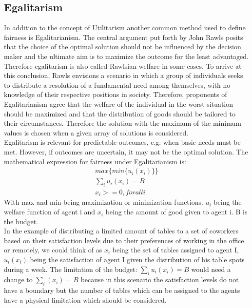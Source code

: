 \documentclass[german, a4paper, 11pt, oneside]{scrbook}
\begin{document}
\subsection{Egalitarism}
In addition to the concept of Utilitarism another common method used to define fairness is Egalitarianism. The central argument put forth by John Rawls posits that the choice of the optimal solution should not be influenced by the decision maker and the ultimate aim is to maximize the outcome for the least advantaged. \cite{XinyingChen.2023,.} Therefore egalitarism is also called Rawlsian welfare in some cases. To arrive at this conclusion, Rawls envisions a scenario in which a group of individuals seeks to distribute a resolution of a fundamental need among themselves, with no knowledge of their respective positions in society. Therefore, proponents of Egalitarianism agree that the welfare of the individual in the worst situation should be maximized and that the distribution of goods should be tailored to their circumstances. Therefore the solution with the maximum of the minimum values is chosen when a given array of solutions is considered. \\
 \cite{XinyingChen.2023,.,FelixBrandtVincentConitzerUlleEndrissJeromeLangandArielD.Procaccia.} Egalitarism is relevant for predictable outcomes, e.g. when basic needs must be met.\cite{.} However, if outcomes are uncertain, it may not be the optimal solution. The mathematical expression for fairness under Egalitarianism is: \cite{.}
\begin{align}
max\{ min\{u_i(x_i)\}\}\\
\sum_{i}u_i(x_i) = B\\
x_i>=0, for all  i
\end{align}
With max and min being maximization or minimization functions. $u_i$ being the welfare function of agent i and $x_i$ being the amount of good given to agent i. B is the budget.
\\In the example of distributing a limited amount of tables to a set of coworkers based on their satisfaction levels due to their preferences of working in the office or remotely, we could think of as $x_i$ being the set of tables assigned to agent I, $u_i(x_i)$ being the satisfaction of agent I given the distribution of his table spots during a week. The limitation of the budget: $\sum_{i}u_i(x_i) = B$ would need a change to $\sum_{i}(x_i) = B$ because in this scenario the satisfaction levels do not have a boundary but the number of tables which can be assigned to the agents have a physical limitation which should be considered.
\end{document}
